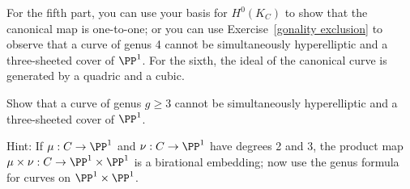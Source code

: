 For the fifth part, you can use your basis for $H^0(K_C)$ to show that the canonical map is one-to-one; or you can use Exercise~\ref{gonality exclusion} to observe that a curve of genus 4 cannot be simultaneously hyperelliptic and a three-sheeted cover of $\PP^1$. For the sixth, the ideal of the canonical curve is generated by a quadric and a cubic.

\begin{exercise}\label{gonality exclusion}
Show that a curve of genus $g \geq 3$ cannot be simultaneously hyperelliptic and a three-sheeted cover of $\PP^1$.

Hint: If $\mu : C \to \PP^1$ and $\nu : C \to \PP^1$ have degrees 2 and 3, the product map $\mu \times \nu : C \to \PP^1 \times \PP^1$ is a birational embedding; now use the genus formula for curves on $\PP^1 \times \PP^1$.
\end{exercise}


